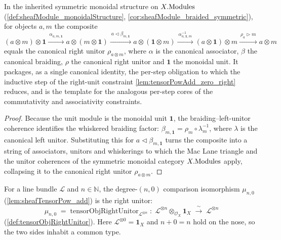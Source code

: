 \begin{lemma}

  \label{lem:canonical_runit_core}
  In the inherited symmetric monoidal structure on \(X.\mathrm{Modules}\)
  (\cref{def:sheafModule_monoidalStructure},
  \cref{cor:sheafModule_braided_symmetric}), for objects \(a, m\) the composite
  \[
    (a \otimes m) \otimes \mathbf{1}
      \xrightarrow{\ \alpha_{a,m,\mathbf{1}}\ }
    a \otimes (m \otimes \mathbf{1})
      \xrightarrow{\ a \lhd \beta_{m,\mathbf{1}}\ }
    a \otimes (\mathbf{1} \otimes m)
      \xrightarrow{\ \alpha^{-1}_{a,\mathbf{1},m}\ }
    (a \otimes \mathbf{1}) \otimes m
      \xrightarrow{\ \rho_a \rhd m\ }
    a \otimes m
  \]
  equals the canonical right unitor \(\rho_{a \otimes m}\), where \(\alpha\) is the
  canonical associator, \(\beta\) the canonical braiding, \(\rho\) the canonical
  right unitor and \(\mathbf{1}\) the monoidal unit. It packages, as a single
  canonical identity, the per-step obligation to which the inductive step of the
  right-unit constraint \cref{lem:tensorPowAdd_zero_right} reduces, and is the
  template for the analogous per-step cores of the commutativity and associativity
  constraints.
\end{lemma}

\begin{proof}
  \leanok
  Because the unit module is the monoidal unit \(\mathbf{1}\), the
  braiding--left-unitor coherence identifies the whiskered braiding factor:
  \(\beta_{m,\mathbf{1}} = \rho_m \circ \lambda_m^{-1}\), where \(\lambda\) is the
  canonical left unitor. Substituting this for \(a \lhd \beta_{m,\mathbf{1}}\)
  turns the composite into a string of associators, unitors and whiskerings to
  which the Mac Lane triangle and the unitor coherences of the symmetric monoidal
  category \(X.\mathrm{Modules}\) apply, collapsing it to the canonical right unitor
  \(\rho_{a \otimes m}\).
\end{proof}

\begin{lemma}

  \label{lem:tensorPowAdd_zero_right}
  For a line bundle \(\mathcal{L}\) and \(n \in \mathbb{N}\), the degree-\((n,0)\)
  comparison isomorphism \(\mu_{n,0}\) (\cref{lem:sheafTensorPow_add}) is the right
  unitor:
  \[
    \mu_{n,0} \;=\;
      \mathrm{tensorObjRightUnitor}_{\mathcal{L}^{\otimes n}}
    \;:\; \mathcal{L}^{\otimes n} \otimes_{\mathcal{O}_X} \mathbf{1}_X
    \;\xrightarrow{\ \sim\ }\; \mathcal{L}^{\otimes n}
  \]
  (\cref{def:tensorObjRightUnitor}). Here \(\mathcal{L}^{\otimes 0} = \mathbf{1}_X\)
  and \(n + 0 = n\) hold on the nose, so the two sides inhabit a common type.
\end{lemma}

